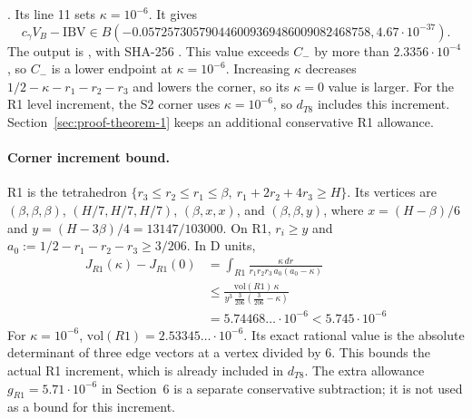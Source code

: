 {.
Its line 11 sets $\kappa=10^{-6}$. It gives
\[
 c_\gamma V_B-\mathrm{IBV}\in
 B(-0.057257305790446009369486009082468758,4.67\cdot10^{-37}).
\]
The output is , with SHA-256
.
This value exceeds $C_-$ by more than $2.3356\cdot10^{-4}$, so $C_-$
is a lower endpoint at $\kappa=10^{-6}$. Increasing $\kappa$
decreases $1/2-\kappa-r_1-r_2-r_3$ and lowers the corner, so its
$\kappa=0$ value is larger.
For the R1 level increment, the S2 corner uses $\kappa=10^{-6}$,
so $d_{T8}$ includes this increment.
Section~\ref{sec:proof-theorem-1} keeps an additional conservative R1 allowance.

\paragraph{Corner increment bound.} R1 is the tetrahedron
$\{r_3\le r_2\le r_1\le\beta,\ r_1+2r_2+4r_3\ge H\}$. Its vertices are
$(\beta,\beta,\beta)$, $(H/7,H/7,H/7)$, $(\beta,x,x)$, and
$(\beta,\beta,y)$, where $x=(H-\beta)/6$ and
$y=(H-3\beta)/4=13147/103000$. On R1, $r_i\ge y$ and
$a_0:=1/2-r_1-r_2-r_3\ge3/206$. In D units,
\[
\begin{aligned}
 J_{R1}(\kappa)-J_{R1}(0)&=\int_{R1}\frac{\kappa\,dr}{r_1r_2r_3\,a_0(a_0-\kappa)}\\
&\le\frac{\mathrm{vol}(R1)\,\kappa}{y^3\,\tfrac3{206}(\tfrac3{206}-\kappa)}\\
 &=5.74468\ldots\cdot10^{-6}<5.745\cdot10^{-6}
\end{aligned}
\]
For $\kappa=10^{-6}$,
$\mathrm{vol}(R1)=2.53345\ldots\cdot10^{-6}$. Its exact rational value
is the absolute determinant of three edge vectors at a vertex divided by $6$.
This bounds the actual R1 increment, which is already included in $d_{T8}$.
The extra allowance $g_{R1}=5.71\cdot10^{-6}$ in Section~6 is a separate
conservative subtraction; it is not used as a bound for this increment.

}
